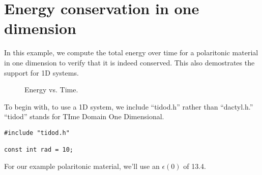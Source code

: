 \begin{comment}
#include <stdio.h>
#include <stdlib.h>
#include <signal.h>
\end{comment}

\section{Energy conservation in one dimension}

In this example, we compute the total energy over time for a polaritonic
material in one dimension to verify that it is indeed conserved.  This also
demostrates the support for 1D systems.

\begin{figure}
\label{econs_1d}
\caption{Energy vs. Time.}
\end{figure}

To begin with, to use a 1D system, we include ``tidod.h'' rather than
``dactyl.h.''  ``tidod'' stands for TIme Domain One Dimensional.  

\begin{verbatim}
#include "tidod.h"

const int rad = 10;
\end{verbatim}

For our example polaritonic material, we'll use an $\epsilon(0)$ of 13.4.

